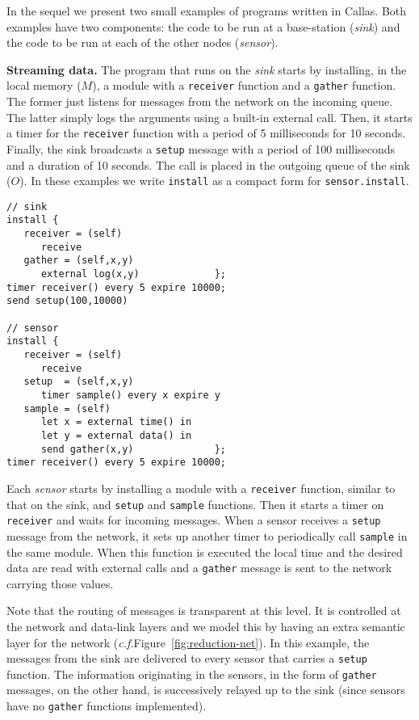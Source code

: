 \documentclass[copyright,creativecommons]{eptcs}
\def\cf{\emph{c.f.}\;}
\begin{document}
In the sequel we present two small examples of programs written in
Callas. Both examples have two components: the code to be run at a
base-station (\emph{sink}) and the code to be run at each of the
other nodes (\emph{sensor}).


\textbf{Streaming data.} The program that runs on the \emph{sink}
starts by installing, in the local memory ($M$), a module with a
\lstinline{receiver} function and a \lstinline{gather} function. The
former just listens for messages from the network on the incoming
queue. The latter simply logs the arguments using a built-in external
call. Then, it starts a timer for the \lstinline{receiver} function
with a period of 5 milliseconds for 10 seconds. Finally, the sink
broadcasts a \lstinline{setup} message with a period of 100
milliseconds and a duration of 10 seconds. The call is placed in the
outgoing queue of the sink ($O$). In these examples we write
\lstinline{install} as a compact form for \lstinline{sensor.install}.\\

\begin{lstlisting}
// sink
install { 
   receiver = (self) 
      receive
   gather = (self,x,y) 
      external log(x,y)             };
timer receiver() every 5 expire 10000;
send setup(100,10000)

// sensor
install { 
   receiver = (self) 
      receive
   setup  = (self,x,y) 
      timer sample() every x expire y
   sample = (self) 
      let x = external time() in 
      let y = external data() in 
      send gather(x,y)              };
timer receiver() every 5 expire 10000;
\end{lstlisting}

Each \emph{sensor} starts by installing a module with a
\lstinline{receiver} function, similar to that on the sink, and
\lstinline{setup} and \lstinline{sample} functions. Then it starts a
timer on \lstinline{receiver} and waits for incoming messages. When a
sensor receives a \lstinline{setup} message from the network, it sets
up another timer to periodically call \lstinline{sample} in the same
module. When this function is executed the local time and the desired
data are read with external calls and a \lstinline{gather} message is
sent to the network carrying those values.

Note that the routing of messages is transparent at this level. It is
controlled at the network and data-link layers and we model this by
having an extra semantic layer for the network
(\cf Figure~\ref{fig:reduction-net}). In this example, the messages
from the sink are delivered to every sensor that carries a
\lstinline{setup} function. The information originating in the
sensors, in the form of \lstinline{gather} messages, on the other
hand, is successively relayed up to the sink (since sensors have no
\lstinline{gather} functions implemented).
\end{document}
